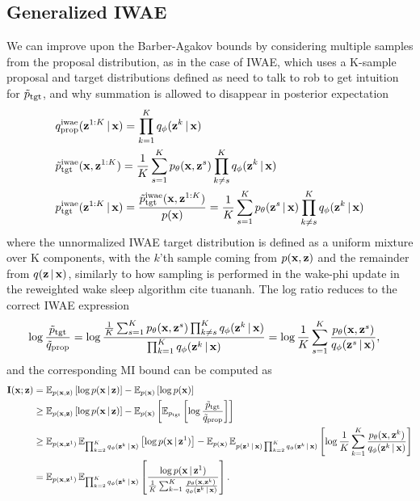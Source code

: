 \subsection{Generalized IWAE}

We can improve upon the Barber-Agakov bounds by considering multiple samples from the proposal distribution, as in the case of \gls{IWAE}, which uses a K-sample proposal and target distributions defined as \alert{need to talk to rob to get intuition for $\ttgt$, and why summation is allowed to disappear in posterior expectation}
\begin{align}
    &\prop^{\text{iwae}}(\vz^{1:K}|\vx) = \prod_{k=1}^K q_{\phi}(\vz^k|\vx) \\
    & \ttgt^{\text{iwae}}(\vx, \vz^{1:K}) = \frac{1}{K} \sum_{s=1}^K p_{\theta}(\vx, \vz^s) \prod_{k\ne s}^K q_{\phi}(\vz^k|\vx)\\
    & \tgt^{\text{iwae}}(\vz^{1:K}|\vx) = \frac{\ttgt^{\text{iwae}}(\vx, \vz^{1:K})}{\px} = \frac{1}{K} \sum_{s=1}^K p_{\theta}(\vz^s|\vx) \prod_{k\ne s}^K q_{\phi}(\vz^k|\vx)
\end{align}
where the unnormalized \gls{IWAE} target distribution is defined as a uniform mixture over K components, with the $k$'th sample coming from $p(\vx,\vz)$ and the remainder from $q(\vz|\vx)$, similarly to how sampling is performed in the wake-phi update in the reweighted wake sleep algorithm \alert{cite tuananh}. The log ratio reduces to the correct \gls{IWAE} expression 
\begin{align}
    \log \frac{\ttgt}{\tprop} &= \log \frac{\frac{1}{K} \sum_{s=1}^K p_{\theta}(\vx, \vz^s) \prod_{k\ne s}^K q_{\phi}(\vz^k|\vx)}{\prod_{k=1}^K q_{\phi}(\vz^k|\vx)} = \log \frac{1}{K} \sum_{s=1}^K \frac{p_{\theta}(\vx, \vz^s)}{q_{\phi}(\vz^s|\vx)},
\end{align}
and the corresponding MI bound can be computed as 
\begin{align}
    \mathbf{I}(\vx ; \vz) &=  \E_{\joint}\left[\log \pxgivenz\right] - \E_{\px} \left[\log \px\right]\\ 
    &\ge  \E_{\joint}\left[\log \pxgivenz\right] - \E_{\px} \left[\E_{\tgt}\left[\log \frac{\ttgt}{\tprop}\right]\right] \\ 
    &\ge  \E_{p(\vx, \vz^1)}\E_{\prod_{k=2}^K q_{\phi}(\vz^k|\vx)}\left[\log p(\vx|\vz^1) \right] - \E_{\px} \E_{p(\vz^1|\vx)\prod_{k=2}^K q_{\phi}(\vz^k|\vx)}\left[ \log \frac{1}{K} \sum_{k=1}^K \frac{p_{\theta}(\vx, \vz^k)}{q_{\phi}(\vz^k|\vx)} \right]\\
    &= \E_{p(\vx, \vz^1)}\E_{\prod_{k=2}^K q_{\phi}(\vz^k|\vx)}\left[\frac{\log p(\vx| \vz^1)}{\frac{1}{K} \sum_{k=1}^K \frac{p_{\theta}(\vx, \vz^k)}{q_{\phi}(\vz^k|\vx)}}\right] \label{eq:iwae-mi-bound}.
\end{align}
